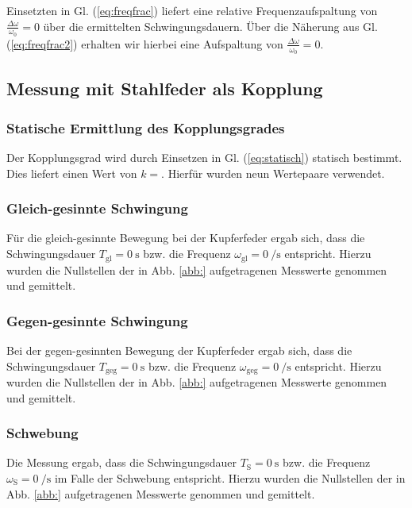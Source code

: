 \documentclass[11pt,a4paper,titlepage, ngerman]{article}
\newcommand{\refeq}[1]{Gl. (\ref{eq:#1})}
\newcommand{\refabb}[1]{Abb. \ref{abb:#1}}
\begin{document}
				Einsetzten in \refeq{freqfrac} liefert eine relative Frequenzaufspaltung von $\frac{\Delta\omega}{\omega_0} = 0$ über die ermittelten Schwingungsdauern. Über die Näherung aus \refeq{freqfrac2} erhalten wir hierbei eine Aufspaltung von $\frac{\Delta\omega}{\omega_0} = 0$.
				
		\subsection{Messung mit Stahlfeder als Kopplung}	
					
			\subsubsection{Statische Ermittlung des Kopplungsgrades}							
			
				Der Kopplungsgrad wird durch Einsetzen in \refeq{statisch} statisch bestimmt. Dies liefert einen Wert von $k=$. Hierfür wurden neun Wertepaare verwendet. 
			
			\subsubsection{Gleich-gesinnte Schwingung}
			
				Für die gleich-gesinnte Bewegung bei der Kupferfeder ergab sich, dass die Schwingungsdauer $T_\text{gl} = \SI{0}{\s}$ bzw. die Frequenz $\omega_\text{gl}  = \SI{0}{\per\s}$ entspricht. Hierzu wurden die Nullstellen der in \refabb{} aufgetragenen Messwerte genommen und gemittelt. 
			
			\subsubsection{Gegen-gesinnte Schwingung}
			
				Bei der gegen-gesinnten Bewegung der Kupferfeder ergab sich, dass die Schwingungsdauer $T_\text{geg} = \SI{0}{\s}$ bzw. die Frequenz $\omega_\text{geg}  = \SI{0}{\per\s}$ entspricht. Hierzu wurden die Nullstellen der in \refabb{} aufgetragenen Messwerte genommen und gemittelt. 
			
			\subsubsection{Schwebung}
			
				Die Messung ergab, dass die Schwingungsdauer $T_\text{S} = \SI{0}{\s}$ bzw. die Frequenz $\omega_\text{S} = \SI{0}{\per\s}$ im Falle der Schwebung entspricht. Hierzu wurden die Nullstellen der in \refabb{} aufgetragenen Messwerte genommen und gemittelt. 
			
\end{document}
